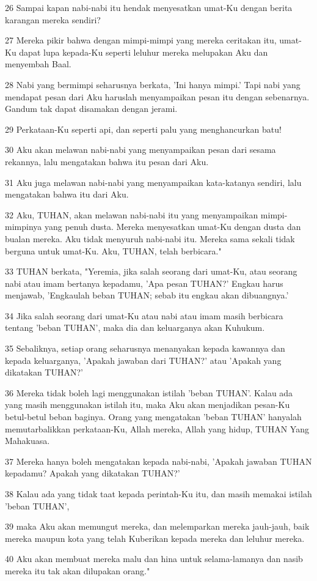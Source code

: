 \par 26 Sampai kapan nabi-nabi itu hendak menyesatkan umat-Ku dengan berita karangan mereka sendiri?
\par 27 Mereka pikir bahwa dengan mimpi-mimpi yang mereka ceritakan itu, umat-Ku dapat lupa kepada-Ku seperti leluhur mereka melupakan Aku dan menyembah Baal.
\par 28 Nabi yang bermimpi seharusnya berkata, 'Ini hanya mimpi.' Tapi nabi yang mendapat pesan dari Aku haruslah menyampaikan pesan itu dengan sebenarnya. Gandum tak dapat disamakan dengan jerami.
\par 29 Perkataan-Ku seperti api, dan seperti palu yang menghancurkan batu!
\par 30 Aku akan melawan nabi-nabi yang menyampaikan pesan dari sesama rekannya, lalu mengatakan bahwa itu pesan dari Aku.
\par 31 Aku juga melawan nabi-nabi yang menyampaikan kata-katanya sendiri, lalu mengatakan bahwa itu dari Aku.
\par 32 Aku, TUHAN, akan melawan nabi-nabi itu yang menyampaikan mimpi-mimpinya yang penuh dusta. Mereka menyesatkan umat-Ku dengan dusta dan bualan mereka. Aku tidak menyuruh nabi-nabi itu. Mereka sama sekali tidak berguna untuk umat-Ku. Aku, TUHAN, telah berbicara."
\par 33 TUHAN berkata, "Yeremia, jika salah seorang dari umat-Ku, atau seorang nabi atau imam bertanya kepadamu, 'Apa pesan TUHAN?' Engkau harus menjawab, 'Engkaulah beban TUHAN; sebab itu engkau akan dibuangnya.'
\par 34 Jika salah seorang dari umat-Ku atau nabi atau imam masih berbicara tentang 'beban TUHAN', maka dia dan keluarganya akan Kuhukum.
\par 35 Sebaliknya, setiap orang seharusnya menanyakan kepada kawannya dan kepada keluarganya, 'Apakah jawaban dari TUHAN?' atau 'Apakah yang dikatakan TUHAN?'
\par 36 Mereka tidak boleh lagi menggunakan istilah 'beban TUHAN'. Kalau ada yang masih menggunakan istilah itu, maka Aku akan menjadikan pesan-Ku betul-betul beban baginya. Orang yang mengatakan 'beban TUHAN' hanyalah memutarbalikkan perkataan-Ku, Allah mereka, Allah yang hidup, TUHAN Yang Mahakuasa.
\par 37 Mereka hanya boleh mengatakan kepada nabi-nabi, 'Apakah jawaban TUHAN kepadamu? Apakah yang dikatakan TUHAN?'
\par 38 Kalau ada yang tidak taat kepada perintah-Ku itu, dan masih memakai istilah 'beban TUHAN',
\par 39 maka Aku akan memungut mereka, dan melemparkan mereka jauh-jauh, baik mereka maupun kota yang telah Kuberikan kepada mereka dan leluhur mereka.
\par 40 Aku akan membuat mereka malu dan hina untuk selama-lamanya dan nasib mereka itu tak akan dilupakan orang."

